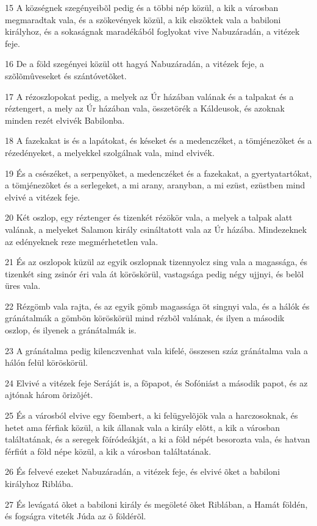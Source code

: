 \par 15 A községnek szegényeibõl pedig és a többi nép közül, a kik a városban megmaradtak vala, és a szökevények közül, a kik elszöktek vala a babiloni királyhoz, és a sokaságnak maradékából foglyokat vive Nabuzáradán, a vitézek feje.
\par 16 De a föld szegényei közül ott hagyá Nabuzáradán, a vitézek feje, a szõlõmûveseket és szántóvetõket.
\par 17 A rézoszlopokat pedig, a melyek az Úr házában valának és a talpakat és a réztengert, a mely az Úr házában vala, összetörék a Káldeusok, és azoknak minden rezét elvivék Babilonba.
\par 18 A fazekakat is és a lapátokat, és késeket és a medenczéket, a tömjénezõket és a rézedényeket, a melyekkel szolgálnak vala, mind elvivék.
\par 19 És a csészéket, a serpenyõket, a medenczéket és a fazekakat, a gyertyatartókat, a tömjénezõket és a serlegeket, a mi arany, aranyban, a mi ezüst, ezüstben mind elvivé a vitézek feje.
\par 20 Két oszlop, egy réztenger és tizenkét rézökör vala, a melyek a talpak alatt valának, a melyeket Salamon király csináltatott vala az Úr házába. Mindezeknek az edényeknek reze megmérhetetlen vala.
\par 21 És az oszlopok küzül az egyik oszlopnak tizennyolcz sing vala a magassága, és tizenkét sing zsinór éri vala át köröskörül, vastagsága pedig négy ujjnyi, és belõl üres vala.
\par 22 Rézgömb vala rajta, és az egyik gömb magassága öt singnyi vala, és a hálók és gránátalmák a gömbön köröskörül mind rézbõl valának, és ilyen a második oszlop, és ilyenek a gránátalmák is.
\par 23 A gránátalma pedig kilenczvenhat vala kifelé, összesen száz gránátalma vala a hálón felül köröskörül.
\par 24 Elvivé a vitézek feje Seráját is, a fõpapot, és Sofóniást a második papot, és az ajtónak három õrizõjét.
\par 25 És a városból elvive egy fõembert, a ki felügyelõjök vala a harczosoknak, és hetet ama férfiak közül, a kik állanak vala a király elõtt, a kik a városban találtatának, és a seregek fõíródeákját, a ki a föld népét besorozta vala, és hatvan férfiút a föld népe közül, a kik a városban találtatának.
\par 26 És felvevé ezeket Nabuzáradán, a vitézek feje, és elvivé õket a babiloni királyhoz Riblába.
\par 27 És levágatá õket a babiloni király és megöleté õket Riblában, a Hamát földén, és fogságra viteték Júda az õ földérõl.
